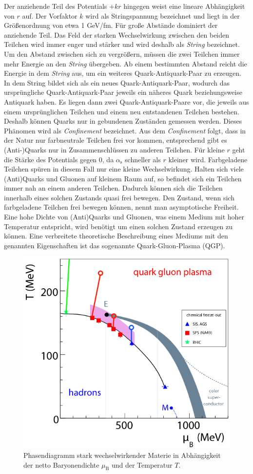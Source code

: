 \newline
Der anziehende Teil des Potentials $+kr$ hingegen weist eine lineare Abh\"angigkeit von $r$ auf.
Der Vorfaktor $k$ wird als Stringspannung bezeichnet und liegt in der Gr\"o{\ss}enordnung von etwa 1 GeV/fm.
F\"ur gro{\ss}e Abst\"ande dominiert der anziehende Teil.
Das Feld der starken Wechselwirkung zwischen den beiden Teilchen wird immer enger und st\"arker und wird deshalb als \textit{String} bezeichnet.
Um den Abstand zwischen sich zu vergr\"o{\ss}ern, m\"ussen die zwei Teilchen immer mehr Energie an den \textit{String} \"ubergeben.
Ab einem bestimmten Abstand reicht die Energie in dem \textit{String} aus, um ein weiteres Quark-Antiquark-Paar zu erzeugen.
In dem String bildet sich als ein neues Quark-Antiquark-Paar, wodurch das urspr\"ungliche Quark-Antiquark-Paar jeweils ein n\"aheres Quark beziehungsweise Antiquark haben.
Es liegen dann zwei Quark-Antiquark-Paare vor, die jeweils aus einem urspr\"unglichen Teilchen und einem neu entstandenen Teilchen bestehen.
Deshalb k\"onnen Quarks nur in gebundenen Zust\"anden gemessen werden.
Dieses Ph\"anomen wird als \textit{Confinement} bezeichnet.
Aus dem \textit{Confinement} folgt, dass in der Natur nur farbneutrale Teilchen frei vor kommen, entsprechend gibt es (Anti-)Quarks nur in Zusammenschl\"ussen zu anderen Teilchen.%
\newline
F\"ur kleine $r$ geht die St\"arke des Potentials gegen 0, da $\alpha_\text{s}$ schneller als $r$ kleiner wird.
Farbgeladene Teilchen sp\"uren in diesem Fall nur eine kleine Wechselwirkung.
Halten sich viele (Anti)Quarks und Gluonen auf kleinem Raum auf, so befindet sich ein Teilchen immer nah an einem anderen Teilchen.
Dadurch k\"onnen sich die Teilchen innerhalb eines solchen Zustands quasi frei bewegen.
Den Zustand, wenn sich farbgeladene Teilchen frei bewegen k\"onnen, nennt man asymptotische Freiheit.
\newline
Eine hohe Dichte von (Anti)Quarks und Gluonen, was einem Medium mit hoher Temperatur entspricht, wird ben\"otigt um einen solchen Zustand erzeugen zu k\"onnen.
Eine verbreitete theoretische Beschreibung eines Mediums mit den genannten Eigenschaften ist das sogenannte Quark-Gluon-Plasma (QGP).
\begin{figure}[tp]
\centering
\includegraphics[width=.6\linewidth]{Phasediagram_Points-2008-neu.png}
\caption{Phasendiagramm stark wechselwirkender Materie in Abh\"angigkeit der netto Baryonendichte $\mu_{\text{B}}$ und der Temperatur $T$.
\cite{PAPER:Phasediagaram}}
\label{fig:QGPPhase}
\end{figure}
